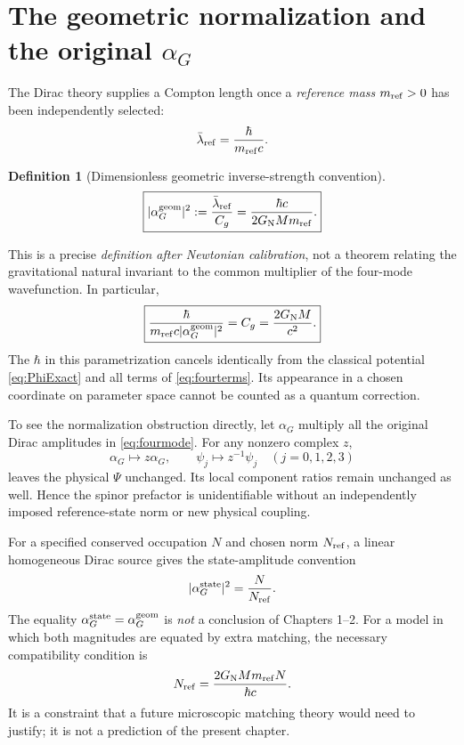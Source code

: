 \documentclass[11pt,a4paper,oneside]{report}
\numberwithin{equation}{chapter}
\theoremstyle{definition}\newtheorem{definition}[theorem]{Definition}
\theoremstyle{remark}\newtheorem{remark}[theorem]{Remark}
\newcommand{\GNewton}{G_{\mathrm N}}
\begin{document}
\section{The geometric normalization and the original $\alpha_G$}\label{sec:alpha}
The Dirac theory supplies a Compton length once a \emph{reference mass} $m_{\rm ref}>0$ has been independently selected:
\begin{equation}
 \bar\lambda_{\rm ref}=\frac{\hbar}{m_{\rm ref}c}.
\end{equation}
\begin{definition}[Dimensionless geometric inverse-strength convention]
\begin{equation}
 \boxed{\displaystyle
 |\alpha_G^{\rm geom}|^2
 :=\frac{\bar\lambda_{\rm ref}}{C_g}
 =\frac{\hbar c}{2\GNewton M m_{\rm ref}}.}
 \label{eq:geomalpha}
\end{equation}
\end{definition}
This is a precise \emph{definition after Newtonian calibration}, not a theorem relating the gravitational natural invariant to the common multiplier of the four-mode wavefunction. In particular,
\begin{equation}
 \boxed{\displaystyle
 \frac{\hbar}{m_{\rm ref}c|\alpha_G^{\rm geom}|^2}=C_g
 =\frac{2\GNewton M}{c^2}.}
 \label{eq:hcancellation}
\end{equation}
The $\hbar$ in this parametrization cancels identically from the classical potential \eqref{eq:PhiExact} and all terms of \eqref{eq:fourterms}. Its appearance in a chosen coordinate on parameter space cannot be counted as a quantum correction.

To see the normalization obstruction directly, let $\alpha_G$ multiply all the original Dirac amplitudes in \eqref{eq:fourmode}. For any nonzero complex $z$,
\begin{equation}
 \alpha_G\longmapsto z\alpha_G,\qquad
 \psi_j\longmapsto z^{-1}\psi_j\quad(j=0,1,2,3)
 \label{eq:rescaling}
\end{equation}
leaves the physical $\Psi$ unchanged. Its local component ratios remain unchanged as well. Hence the spinor prefactor is unidentifiable without an independently imposed reference-state norm or new physical coupling.

For a specified conserved occupation $N$ and chosen norm $N_{\rm ref}$, a linear homogeneous Dirac source gives the state-amplitude convention
\begin{equation}
 |\alpha_G^{\rm state}|^2=\frac{N}{N_{\rm ref}}.
 \label{eq:statealpha}
\end{equation}
The equality $\alpha_G^{\rm state}=\alpha_G^{\rm geom}$ is \emph{not} a conclusion of Chapters 1--2. For a model in which both magnitudes are equated by extra matching, the necessary compatibility condition is
\begin{equation}
 N_{\rm ref}=\frac{2\GNewton M m_{\rm ref}N}{\hbar c}.
 \label{eq:compatibility}
\end{equation}
It is a constraint that a future microscopic matching theory would need to justify; it is not a prediction of the present chapter.
\end{document}
